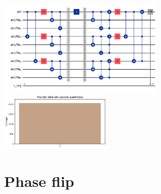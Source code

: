 \documentclass[12pt, a4paper]{article}
\begin{document}
\begin{center} 
        \includegraphics[width=0.6\textwidth]{img/circuit.png} 
        \includegraphics[width=0.4\textwidth]{img/resultsSuccess.png}
\end{center}

\section*{Phase flip}
\end{document}

